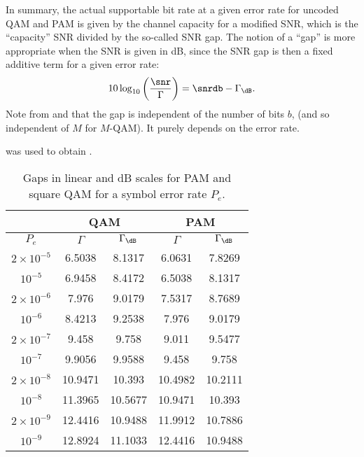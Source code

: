In summary, the actual supportable bit rate at a given error rate for uncoded QAM and PAM is given by the channel capacity for a modified SNR, which is the ``capacity'' SNR divided by the so-called SNR gap. The notion of a ``gap'' is more appropriate when the SNR is given in dB, since the SNR gap is then a fixed additive term for
a given error rate:
\[
10 \log_{10} \left( \frac{\snr}{\Gamma} \right) = \snrdb - \Gamma_\dB.
\]
Note from  and  that the gap is independent of the number of
bits $b$, (and so independent of $M$ for $M$-QAM). It purely depends on
the error rate.

 was used to obtain .

\begin{table}
\centering
\caption{Gaps in linear and dB scales for PAM and square QAM for a symbol error rate $P_e$.\label{tab:pam_qam_gaps}}
\begin{tabular}{|c|c|c|c|c|}
\hline
& \multicolumn{2}{|c|}{QAM} & \multicolumn{2}{|c|}{PAM} \\ \hline
$P_e$ & $\Gamma$ & $\Gamma_\dB$ & $\Gamma$ & $\Gamma_\dB$  \\ \hline
$2 \times 10^{-5}$ & 6.5038 & 8.1317 & 6.0631 & 7.8269 \\ \hline 
$10^{-5}$ & 6.9458 & 8.4172 & 6.5038 & 8.1317 \\ \hline 
$2 \times 10^{-6}$ & 7.976 & 9.0179 & 7.5317 & 8.7689 \\ \hline 
$10^{-6}$ & 8.4213 & 9.2538 & 7.976 & 9.0179 \\ \hline 
$2 \times 10^{-7}$ & 9.458 & 9.758 & 9.011 & 9.5477 \\ \hline 
$10^{-7}$ & 9.9056 & 9.9588 & 9.458 & 9.758 \\ \hline 
$2 \times 10^{-8}$ & 10.9471 & 10.393 & 10.4982 & 10.2111 \\ \hline 
$10^{-8}$ & 11.3965 & 10.5677 & 10.9471 & 10.393 \\ \hline 
$2 \times 10^{-9}$ & 12.4416 & 10.9488 & 11.9912 & 10.7886 \\ \hline 
$10^{-9}$ & 12.8924 & 11.1033 & 12.4416 & 10.9488 \\ \hline 
\end{tabular}
\end{table}

